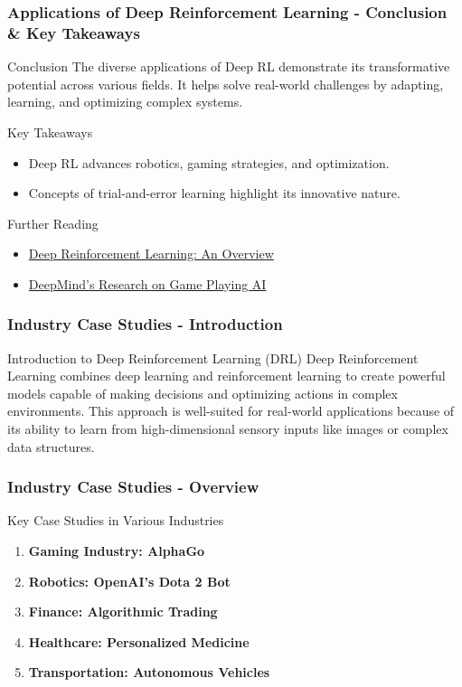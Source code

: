 \documentclass[aspectratio=169]{beamer}
\begin{document}
\begin{frame}[fragile]
  \frametitle{Applications of Deep Reinforcement Learning - Conclusion & Key Takeaways}
  \begin{block}{Conclusion}
    The diverse applications of Deep RL demonstrate its transformative potential across various fields. It helps solve real-world challenges by adapting, learning, and optimizing complex systems.
  \end{block}
  \begin{block}{Key Takeaways}
    \begin{itemize}
      \item Deep RL advances robotics, gaming strategies, and optimization.
      \item Concepts of trial-and-error learning highlight its innovative nature.
    \end{itemize}
  \end{block}
  \begin{block}{Further Reading}
    \begin{itemize}
      \item \href{https://arxiv.org/abs/2003.03371}{Deep Reinforcement Learning: An Overview}
      \item \href{https://deepmind.com/research/case-studies/alphago-the-story-so-far}{DeepMind’s Research on Game Playing AI}
    \end{itemize}
  \end{block}
\end{frame}

\begin{frame}[fragile]
    \frametitle{Industry Case Studies - Introduction}
    \begin{block}{Introduction to Deep Reinforcement Learning (DRL)}
        Deep Reinforcement Learning combines deep learning and reinforcement learning to create powerful models capable of making decisions and optimizing actions in complex environments. 
        This approach is well-suited for real-world applications because of its ability to learn from high-dimensional sensory inputs like images or complex data structures.
    \end{block}
\end{frame}

\begin{frame}[fragile]
    \frametitle{Industry Case Studies - Overview}
    \begin{block}{Key Case Studies in Various Industries}
        \begin{enumerate}
            \item \textbf{Gaming Industry: AlphaGo}
            \item \textbf{Robotics: OpenAI’s Dota 2 Bot}
            \item \textbf{Finance: Algorithmic Trading}
            \item \textbf{Healthcare: Personalized Medicine}
            \item \textbf{Transportation: Autonomous Vehicles}
        \end{enumerate}
    \end{block}
\end{frame}
\end{document}
